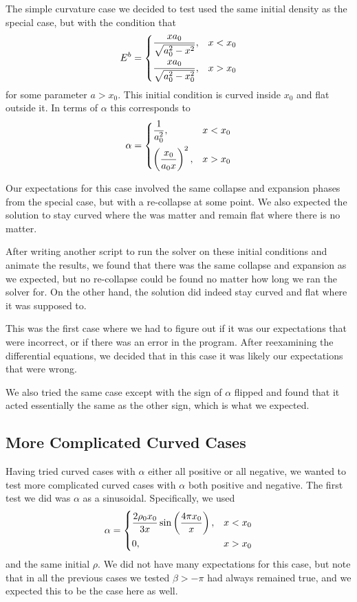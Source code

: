 \documentclass[12pt]{article}
\begin{document}
The simple curvature case we decided to test used the same initial density as the
special case, but with the condition that
\[ E^b = \begin{dcases}
    \frac{xa_0}{\sqrt{a_0^2 - x^2}}, & x < x_0 \\
    \frac{xa_0}{\sqrt{a_0^2 - x_0^2}}, & x > x_0
\end{dcases} \]
for some parameter $a>x_0$. This initial condition is curved inside $x_0$ and flat
outside it. In terms of $\alpha$ this corresponds to
\[ \alpha = \begin{dcases}
    \frac{1}{a_0^2}, & x < x_0 \\
    \left( \frac{x_0}{a_0x} \right)^2, & x > x_0
\end{dcases} \]

Our expectations for this case involved the same collapse and expansion phases from the
special case, but with a re-collapse at some point. We also expected the solution to
stay curved where the was matter and remain flat where there is no matter.

After writing another script to run the solver on these initial conditions and animate
the results, we found that there was the same collapse and expansion as we expected, but
no re-collapse could be found no matter how long we ran the solver for. On the other
hand, the solution did indeed stay curved and flat where it was supposed to.

This was the first case where we had to figure out if it was our expectations that were
incorrect, or if there was an error in the program. After reexamining the differential
equations, we decided that in this case it was likely our expectations that were wrong.

We also tried the same case except with the sign of $\alpha$ flipped and found that it
acted essentially the same as the other sign, which is what we expected.

\subsection{More Complicated Curved Cases}

Having tried curved cases with $\alpha$ either all positive or all negative, we wanted
to test more complicated curved cases with $\alpha$ both positive and negative. The
first test we did was $\alpha$ as a sinusoidal. Specifically, we used
\[ \alpha = \begin{dcases}
    \frac{2\rho_0x_0}{3x} \sin\left(\frac{4\pi x_0}{x}\right), & x < x_0 \\
    0, & x > x_0
\end{dcases} \]
and the same initial $\rho$. We did not have many expectations for this case, but note
that in all the previous cases we tested $\beta > -\pi$ had always remained true, and we
expected this to be the case here as well.
\end{document}

